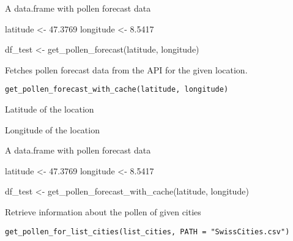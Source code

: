 \documentclass[letterpaper]{book}
\begin{document}
%
\begin{Value}
A data.frame with pollen forecast data
\end{Value}
%
\begin{Examples}
\begin{ExampleCode}
latitude <- 47.3769
longitude <- 8.5417

df_test <- get_pollen_forecast(latitude, longitude)

\end{ExampleCode}
\end{Examples}
%
\begin{Description}
Fetches pollen forecast data from the API for the given location.
\end{Description}
%
\begin{Usage}
\begin{verbatim}
get_pollen_forecast_with_cache(latitude, longitude)
\end{verbatim}
\end{Usage}
%
\begin{Arguments}
\begin{ldescription}
\item[\code{latitude}] Latitude of the location

\item[\code{longitude}] Longitude of the location
\end{ldescription}
\end{Arguments}
%
\begin{Value}
A data.frame with pollen forecast data
\end{Value}
%
\begin{Examples}
\begin{ExampleCode}
latitude <- 47.3769
longitude <- 8.5417

df_test <- get_pollen_forecast_with_cache(latitude, longitude)

\end{ExampleCode}
\end{Examples}
%
\begin{Description}
Retrieve information about the pollen of given cities
\end{Description}
%
\begin{Usage}
\begin{verbatim}
get_pollen_for_list_cities(list_cities, PATH = "SwissCities.csv")
\end{verbatim}
\end{Usage}
\end{document}
